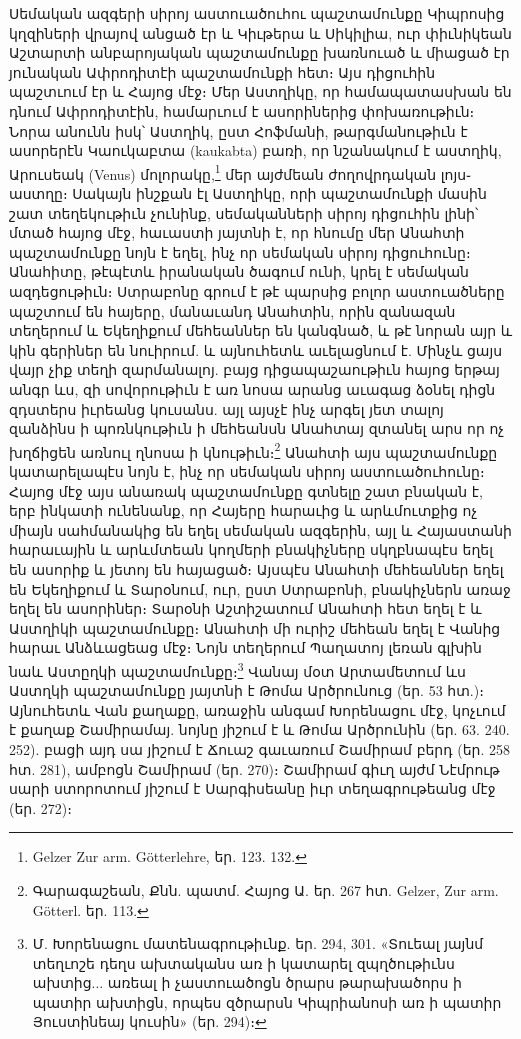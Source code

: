 \documentclass{article}
\begin{document}
{Սեմական ազգերի սիրոյ աստուածուհու պաշտամունքը Կիպրոսից կղզիների վրայով անցած էր և Կիւթերա և Սիկիլիա, ուր փիւնիկեան Աշտարտի անբարոյական պաշտամունքը խառնուած և միացած էր յունական Ափրոդիտէի պաշտամունքի հետ։ Այս դիցուհին պաշտւում էր և Հայոց մէջ։ Մեր Աստղիկը, որ համապատասխան են դնում Ափրոդիտէին, համարւում է ասորիներից փոխառութիւն։ Նորա անունն իսկ՝ Աստղիկ, ըստ Հոֆմանի, թարգմանութիւն է ասորերէն Կաուկաբտա (kaukabta) բառի, որ նշանակում է աստղիկ, Արուսեակ (Venus) մոլորակը,\footnote{Gelzer Zur arm. Götterlehre, եր. 123. 132.} մեր այժմեան ժողովրդական լոյս֊աստղը։ Սակայն ինշքան էլ Աստղիկը, որի պաշտամունքի մասին շատ տեղեկութիւն չունինք, սեմականների սիրոյ դիցուհին լինի՝ մտած հայոց մէջ, հաւաստի յայտնի է, որ հնումը մեր Անահտի պաշտամունքը նոյն է եղել, ինչ որ սեմական սիրոյ դիցուհունը։ Անահիտը, թէպէտև իրանական ծագում ունի, կրել է սեմական ազդեցութիւն։ Ստրաբոնը գրում է թէ պարսից բոլոր աստուածները պաշտում են հայերը, մանաւանդ Անահտին, որին զանազան տեղերում և Եկեղիքում մեհեաններ են կանգնած, և թէ նորան այր և կին գերիներ են նուիրում. և այնուհետև աւելացնում է. Մինչև ցայս վայր չիք տեղի զարմանալոյ. բայց դիցապաշաութիւն հայոց երթայ անգր ևս, զի սովորութիւն է առ նոսա արանց աւագաց ձօնել դիցն զդստերս իւրեանց կուսանս. այլ այսչէ ինչ արգել յետ տալոյ զանձինս ի պոռնկութիւն ի մեհեանսն Անահտայ զտանել արս որ ոչ խղճիցեն առնուլ ղնոսա ի կնութիւն։\footnote{Գարագաշեան, Քնն. պատմ. Հայոց Ա. եր. 267 հտ. Gelzer, Zur arm. Götterl. եր. 113.} Անահտի այս պաշտամունքը կատարելապէս նոյն է, ինչ որ սեմական սիրոյ աստուածուհունը։ Հայոց մէջ այս անառակ պաշտամունքը գտնելը շատ բնական է, երբ ինկատի ունենանք, որ Հայերը հարաւից և արևմուտքից ոչ միայն սահմանակից են եղել սեմական ազգերին, այլ և Հայաստանի հարաւային և արևմտեան կողմերի բնակիչները սկղբնապէս եղել են ասորիք և յետոյ են հայացած։ Այսպէս Անահտի մեհեաններ եղել են Եկեղիքում և Տարօնում, ուր, ըստ Ստրաբոնի, բնակիչներն առաջ եղել են ասորիներ։ Տարօնի Աշտիշատում Անահտի հետ եղել է և Աստղիկի պաշտամունքը։ Անահտի մի ուրիշ մեհեան եղել է Վանից հարաւ Անձևացեաց մէջ։ Նոյն տեղերում Պաղատոյ լեռան գլխին նաև Աստըղկի պաշտամունքը։\footnote{Մ. Խորենացու մատենագրութիւնք. եր. 294, 301. «Տուեալ յայնմ տեղւոշե դեղս ախտականս առ ի կատարել զպղծութիւնս ախտից... առեալ ի չաստուածոցն ծրարս թարախածորս ի պատիր ախտիցն, որպես զծրարսն Կիպրիանոսի առ ի պատիր Յուստինեայ կուսին» (եր. 294)։} Վանայ մօտ Արտամետում ևս Աստղկի պաշտամունքը յայտնի է Թոմա Արծրունուց (եր. 53 հտ.)։ Այնուհետև Վան քաղաքը, առաջին անգամ Խորենացու մէջ, կոչւում է քաղաք Շամիրամայ. նոյնը յիշում է և Թոմա Արծրունին (եր. 63. 240. 252). բացի այդ սա յիշում է Ճուաշ գաւառում Շամիրամ բերդ (եր. 258 հտ. 281), ամբոցն Շամիրամ (եր. 270)։ Շամիրամ գիւղ այժմ Նէմրութ սարի ստորոտում յիշում է Սարգիսեանը իւր տեղագրութեանց մէջ (եր. 272)։

}
\end{document}
